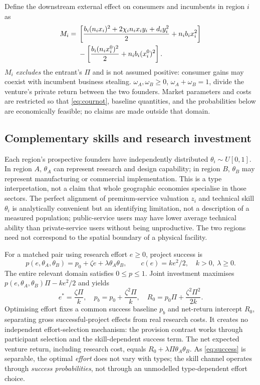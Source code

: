 \documentclass[11pt]{article}
\begin{document}
Define the downstream external effect on consumers and incumbents in region $i$ as
\begin{align}
 M_i={}&
 \left[\frac{b_i(n_ix_i)^2+2\chi_i n_ix_iy_i+d_i y_i^2}{2}
 +n_i b_i x_i^2\right]\notag\\
 &-\left[\frac{b_i(n_ix_i^0)^2}{2}+n_i b_i(x_i^0)^2\right].
 \label{eq:Mi}
\end{align}
$M_i$ \emph{excludes} the entrant's $\Pi$ and is not assumed positive: consumer gains may coexist with incumbent business stealing. $\omega_A,\omega_B\geq0$, $\omega_A+\omega_B=1$, divide the venture's private return between the two founders. Market parameters and costs are restricted so that \eqref{eq:cournot}, baseline quantities, and the probabilities below are economically feasible; no claims are made outside that domain.

\subsection{Complementary skills and research investment}
Each region's prospective founders have independently distributed $\theta_i\sim U[0,1]$. In region $A$, $\theta_A$ can represent research and design capability; in region $B$, $\theta_B$ may represent manufacturing or commercial implementation. This is a type interpretation, not a claim that whole geographic economies specialise in those sectors. The perfect alignment of premium-service valuation $z_i$ and technical skill $\theta_i$ is analytically convenient but an identifying limitation, not a description of a measured population; public-service users may have lower average technical ability than private-service users without being unproductive. The two regions need not correspond to the spatial boundary of a physical facility.

For a matched pair using research effort $e\geq0$, project success is
\begin{equation}
 p(e,\theta_A,\theta_B)=p_0+\zeta e+\lambda\theta_A\theta_B,\qquad
 c(e)=ke^2/2,\quad k>0,\ \lambda\geq0.
 \label{eq:success}
\end{equation}
The entire relevant domain satisfies $0\leq p\leq1$. Joint investment maximises $p(e,\theta_A,\theta_B)\Pi-ke^2/2$ and yields
\begin{equation}
 e^*=\frac{\zeta\Pi}{k},\quad
 p_b=p_0+\frac{\zeta^2\Pi}{k},\quad
 R_0=p_0\Pi+\frac{\zeta^2\Pi^2}{2k}.
 \label{eq:effort}
\end{equation}
Optimising effort fixes a common success baseline $p_b$ and net-return intercept $R_0$, separating gross successful-project effects from real research costs.
It creates no independent effort-selection mechanism: the provision contrast works through participant selection and the skill-dependent success term.
The net expected venture return, including research cost, equals
$R_0+\lambda\Pi\theta_A\theta_B$. As \eqref{eq:success} is separable, the optimal \emph{effort} does not vary with types; the skill channel operates through \emph{success probabilities}, not through an unmodelled type-dependent effort choice.
\end{document}
